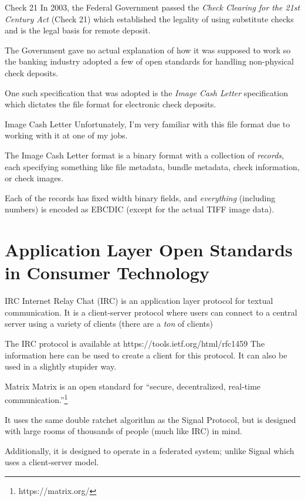 \documentclass{acm}
\begin{document}
\begin{frame}{Check 21}
    In 2003, the Federal Government passed the \textit{Check Clearing for the
        21st Century Act} (Check 21) which established the legality of using
    substitute checks and is the legal basis for remote deposit.
    \pause

    The Government gave no actual explanation of how it was supposed to work so
    the banking industry adopted a few of open standards for handling
    non-physical check deposits.
    \pause

    One such specification that was adopted is the \textit{Image Cash Letter}
    specification which dictates the file format for electronic check deposits.
\end{frame}

\begin{frame}{Image Cash Letter}
    Unfortunately, I'm very familiar with this file format due to working with
    it at one of my jobs.

    The Image Cash Letter format is a binary format with a collection of
    \textit{records}, each specifying something like file metadata, bundle
    metadata, check information, or check images.

    Each of the records has fixed width binary fields, and \textit{everything}
    (including numbers) is encoded as EBCDIC (except for the actual TIFF image
    data).
\end{frame}

\section{Application Layer Open Standards in Consumer Technology}

\begin{frame}{IRC}
    Internet Relay Chat (IRC) is an application layer protocol for textual
    communication. It is a client-server protocol where users can connect to a
    central server using a variety of clients (there are a \textit{ton} of
    clients)
    \pause

    The IRC protocol is available at https://tools.ietf.org/html/rfc1459
    The information here can be used to create a client for this protocol.
    It can also be used in a slightly stupider way.
\end{frame}


\begin{frame}{Matrix}
    Matrix is an open standard for ``secure, decentralized, real-time
    communication.''\footnote[frame]{https://matrix.org/}
    \pause

    It uses the same double ratchet algorithm as the Signal Protocol, but is
    designed with large rooms of thousands of people (much like IRC) in mind.
    \pause

    Additionally, it is designed to operate in a federated system; unlike Signal
    which uses a client-server model.
\end{frame}
\end{document}
